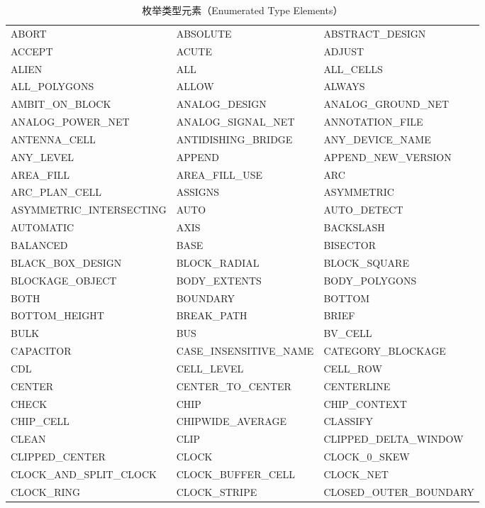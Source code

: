 \begin{longtable}{@{}>{\raggedright\arraybackslash\ttfamily}p{} >{\raggedright\arraybackslash\ttfamily}p{} >{\raggedright\arraybackslash\ttfamily}p{}@{}}
\caption{枚举类型元素（Enumerated Type Elements）}\label{tab:pxl-enum-elems}\\
\toprule
\endfirsthead
\endhead
\bottomrule
\endfoot
ABORT & ABSOLUTE & ABSTRACT\_DESIGN \\
ACCEPT & ACUTE & ADJUST \\
ALIEN & ALL & ALL\_CELLS \\
ALL\_POLYGONS & ALLOW & ALWAYS \\
AMBIT\_ON\_BLOCK & ANALOG\_DESIGN & ANALOG\_GROUND\_NET \\
ANALOG\_POWER\_NET & ANALOG\_SIGNAL\_NET & ANNOTATION\_FILE \\
ANTENNA\_CELL & ANTIDISHING\_BRIDGE & ANY\_DEVICE\_NAME \\
ANY\_LEVEL & APPEND & APPEND\_NEW\_VERSION \\
AREA\_FILL & AREA\_FILL\_USE & ARC \\
ARC\_PLAN\_CELL & ASSIGNS & ASYMMETRIC \\
ASYMMETRIC\_INTERSECTING & AUTO & AUTO\_DETECT \\
AUTOMATIC & AXIS & BACKSLASH \\
BALANCED & BASE & BISECTOR \\
BLACK\_BOX\_DESIGN & BLOCK\_RADIAL & BLOCK\_SQUARE \\
BLOCKAGE\_OBJECT & BODY\_EXTENTS & BODY\_POLYGONS \\
BOTH & BOUNDARY & BOTTOM \\
BOTTOM\_HEIGHT & BREAK\_PATH & BRIEF \\
BULK & BUS & BV\_CELL \\
CAPACITOR & CASE\_INSENSITIVE\_NAME & CATEGORY\_BLOCKAGE \\
CDL & CELL\_LEVEL & CELL\_ROW \\
CENTER & CENTER\_TO\_CENTER & CENTERLINE \\
CHECK & CHIP & CHIP\_CONTEXT \\
CHIP\_CELL & CHIPWIDE\_AVERAGE & CLASSIFY \\
CLEAN & CLIP & CLIPPED\_DELTA\_WINDOW \\
CLIPPED\_CENTER & CLOCK & CLOCK\_0\_SKEW \\
CLOCK\_AND\_SPLIT\_CLOCK & CLOCK\_BUFFER\_CELL & CLOCK\_NET \\
CLOCK\_RING & CLOCK\_STRIPE & CLOSED\_OUTER\_BOUNDARY \\

\end{longtable}
